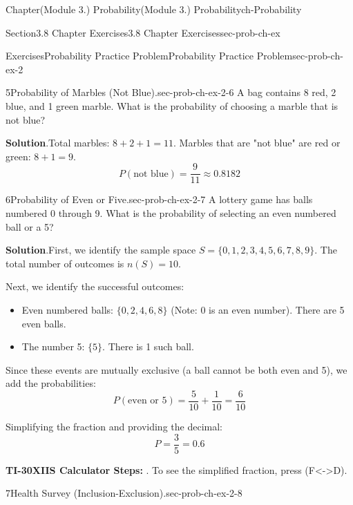\documentclass[oneside,10pt,]{book}
\newcommand{\blocktitlefont}{\relax}
\newcommand{\ptxlistdisc}{\raisebox{0.3ex}{\textbullet}}
\newcommand{\terminology}[1]{\textbf{#1}}
\newcommand{\kbd}[1]{\keys{{#1}}}
\begin{document}
\begin{chapterptx}{Chapter}{(Module 3.) Probability}{}{(Module 3.) Probability}{}{}{ch-Probability}
\begin{sectionptx}{Section}{3.8 Chapter Exercises}{}{3.8 Chapter Exercises}{}{}{sec-prob-ch-ex}
\begin{exercises-subsection-numberless}{Exercises}{Probability Practice Problem}{}{Probability Practice Problem}{}{}{sec-prob-ch-ex-2}
\begin{divisionexercise}{5}{Probability of Marbles (Not Blue).}{}{sec-prob-ch-ex-2-6}%
A bag contains 8 red, 2 blue, and 1 green marble. What is the probability of choosing a marble that is not blue?%
\par\smallskip%
\noindent\textbf{\blocktitlefont Solution}.\hypertarget{sec-prob-ch-ex-2-6-3}{}\quad{}Total marbles: \(8 + 2 + 1 = 11\). Marbles that are "not blue" are red or green: \(8 + 1 = 9\).%
\begin{equation*}
P(\text{not blue}) = \frac{9}{11} \approx 0.8182
\end{equation*}
%
\end{divisionexercise}%
\begin{divisionexercise}{6}{Probability of Even or Five.}{}{sec-prob-ch-ex-2-7}%
A lottery game has balls numbered 0 through 9. What is the probability of selecting an even numbered ball or a 5?%
\par\smallskip%
\noindent\textbf{\blocktitlefont Solution}.\hypertarget{sec-prob-ch-ex-2-7-3}{}\quad{}First, we identify the sample space \(S = \{0, 1, 2, 3, 4, 5, 6, 7, 8, 9\}\). The total number of outcomes is \(n(S) = 10\).%
\par
Next, we identify the successful outcomes:%
\begin{itemize}[label=\ptxlistdisc]
\item{}Even numbered balls: \(\{0, 2, 4, 6, 8\}\) (Note: 0 is an even number). There are 5 even balls.%
\item{}The number 5: \(\{5\}\). There is 1 such ball.%
\end{itemize}
%
\par
Since these events are mutually exclusive (a ball cannot be both even and 5), we add the probabilities:%
\begin{equation*}
P(\text{even or 5}) = \frac{5}{10} + \frac{1}{10} = \frac{6}{10}
\end{equation*}
%
\par
Simplifying the fraction and providing the decimal:%
\begin{equation*}
P = \frac{3}{5} = 0.6
\end{equation*}
%
\par
\terminology{TI-30XIIS Calculator Steps:} \kbd{6} \kbd{÷} \kbd{10} \kbd{ENTER}. To see the simplified fraction, press \kbd{2nd} \kbd{PRB} (F\textless{}-\textgreater{}D).%
\end{divisionexercise}%
\begin{divisionexercise}{7}{Health Survey (Inclusion-Exclusion).}{}{sec-prob-ch-ex-2-8}%

\end{divisionexercise}
\end{exercises-subsection-numberless}
\end{sectionptx}
\end{chapterptx}
\end{document}
